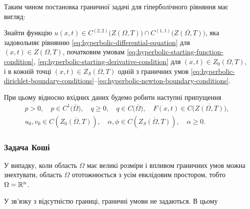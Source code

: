 Таким чином постановка граничної задачі для гіперболічного рівняння має вигляд: \medskip

Знайти функцію $u(x, t) \in C^{(2, 2)} \Big( Z(\Omega, T) \Big) \cap C^{(1, 1)} \Big( \overline {Z(\Omega, T)} \Big)$, яка задовольняє рівнянню \eqref{eq:hyperbolic-differential-equation} для $(x, t) \in Z(\Omega, T)$, початковим умовам \eqref{eq:hyperbolic-starting-function-condition}, \eqref{eq:hyperbolic-starting-derivative-condition} для $(x, t) \in Z_0(\Omega, T)$, і в кожній точці $(x, t) \in Z_S(\Omega, T)$ одній з граничних умов \eqref{eq:hyperbolic-dirichlet-boundary-conditions}--\eqref{eq:hyperbolic-newton-boundary-conditions}. \medskip

При цьому відносно вхідних даних будемо робити наступні припущення
\begin{gather}
    p > 0, \quad p \in C^1 \Big( \overline \Omega \Big), \quad q \ge 0, \quad q \in C \Big( \overline \Omega \Big), \quad F(x, t) \in C \Big( \overline{Z(\Omega, T)} \Big), \\
    u_0, v_0 \in C \left( \overline{Z_0(\Omega, T)} \right), \quad \alpha, \phi \in C \left( \overline{Z_S(\Omega, T)} \right), \quad \alpha \ge 0.
\end{gather}

\subsubsection{Задача Коші}

У випадку, коли область $\Omega$ має великі розміри і впливом граничних умов можна знехтувати, область $\Omega$ ототожнюється з усім евклідовим простором, тобто $\Omega = \mathbb{R}^n$. \medskip

У зв'язку з відсутністю границі, граничні умови не задаються. В цьому

\newpage 

